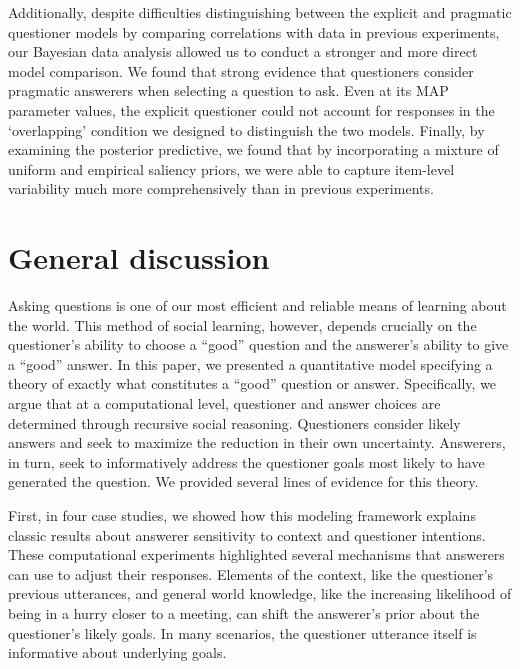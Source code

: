 \documentclass[12pt, floatsintext, jou]{apa6}
\begin{document}
Additionally, despite difficulties distinguishing between the explicit and pragmatic questioner models by comparing correlations with data in previous experiments, our Bayesian data analysis allowed us to conduct a stronger and more direct model comparison. We found that strong evidence that questioners consider pragmatic answerers when selecting a question to ask. Even at its MAP parameter values, the explicit questioner could not account for responses in the `overlapping' condition we designed to distinguish the two models. Finally, by examining the posterior predictive, we found that by incorporating a mixture of uniform and empirical saliency priors, we were able to capture item-level variability much more comprehensively than in previous experiments. 

\section{General discussion}
\label{sec:gd}


Asking questions is one of our most efficient and reliable means of learning about the world. This method of social learning, however, depends crucially on the questioner's ability to choose a ``good'' question and the answerer's ability to give a ``good'' answer. In this paper, we presented a quantitative model specifying a theory of exactly what constitutes a ``good'' question or answer. Specifically, we argue that at a computational level, questioner and answer choices are determined through recursive social reasoning. Questioners consider likely answers and seek to maximize the reduction in their own uncertainty. Answerers, in turn, seek to informatively address the questioner goals most likely to have generated the question. We provided several lines of evidence for this theory. 

First, in four case studies, we showed how this modeling framework explains classic results about answerer sensitivity to context and questioner intentions. These computational experiments highlighted several mechanisms that answerers can use to adjust their responses. Elements of the context, like the questioner's previous utterances, and general world knowledge, like the increasing likelihood of being in a hurry closer to a meeting, can shift the answerer's prior about the questioner's likely goals. In many scenarios, the questioner utterance itself is informative about underlying goals. 
\end{document}
